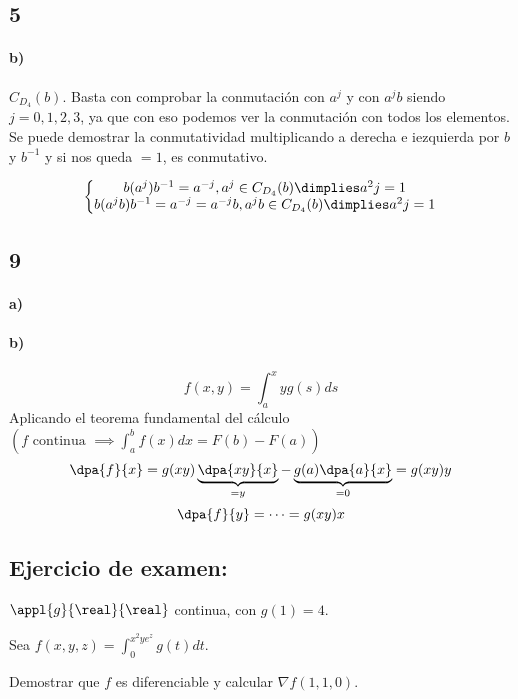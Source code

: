 \subsection{5}

\paragraph{b)}
$C_{D_4}(b)$. Basta con comprobar la conmutación con $a^j$ y con $a^jb$ siendo $j = 0,1,2,3$, ya que con eso podemos ver la conmutación con todos los elementos. Se puede demostrar la conmutatividad multiplicando a derecha e iezquierda por $b$ y $b^{-1}$ y si nos queda $=1$, es conmutativo.

$$\left\{\begin{matrix}b(a^j)b^{-1} = a^{-j}, a^j \in C_{D_4}(b) \dimplies a^2j = 1\\
b(a^jb)b^{-1} = a^{-j} = a^{-j}b, a^jb \in C_{D_4}(b) \dimplies a^2j = 1\end{matrix}\right.$$

\subsection{9}
\paragraph{a)}
\paragraph{b)}

$$f(x,y) = \int_a^xy g(s)ds$$
Aplicando el teorema fundamental del cálculo $\left(f \text{ continua } \implies\displaystyle\int_a^b f(x)dx = F(b)-F(a)\right)$
$$\dpa{f}{x} = g(xy)\underbrace{\dpa{xy}{x}}_{=y} - \underbrace{g(a)\dpa{a}{x}}_{=0}  = g(xy)y$$
$$\dpa{f}{y} = \cdots  = g(xy)x$$

\subsection{Ejercicio de examen:}
$\appl{g}{\real}{\real}$ continua, con $g(1) = 4$.

Sea $f(x,y,z)=\displaystyle \int_0^{x^2ye^z} g(t)dt$.

Demostrar que $f$ es diferenciable y calcular $\nabla f(1,1,0)$.
\newpage
